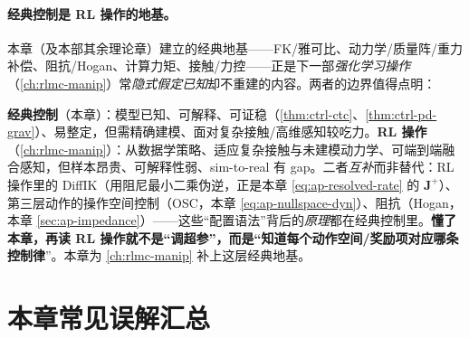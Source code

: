 \paragraph{经典控制是 RL 操作的地基。}
本章（及本部其余理论章）建立的经典地基——FK/雅可比、动力学/质量阵/重力补偿、阻抗/Hogan、计算力矩、接触/力控——正是下一部\emph{强化学习操作}（\cref{ch:rlmc-manip}）常\emph{隐式假定已知}却不重建的内容。两者的边界值得点明：

\begin{insight}\label{ins:ap-rl-boundary}
\textbf{经典控制}（本章）：模型已知、可解释、可证稳（\cref{thm:ctrl-ctc}、\cref{thm:ctrl-pd-grav}）、易整定，但需精确建模、面对复杂接触/高维感知较吃力。\textbf{RL 操作}（\cref{ch:rlmc-manip}）：从数据学策略、适应复杂接触与未建模动力学、可端到端融合感知，但样本昂贵、可解释性弱、sim-to-real 有 gap。二者\emph{互补}而非替代：RL 操作里的 DiffIK（用阻尼最小二乘伪逆，正是本章 \cref{eq:ap-resolved-rate} 的 $\mathbf{J}^{+}$）、第三层动作的操作空间控制（OSC，本章 \cref{eq:ap-nullspace-dyn}）、阻抗（Hogan，本章 \cref{sec:ap-impedance}）——这些“配置语法”背后的\emph{原理}都在经典控制里。\textbf{懂了本章，再读 RL 操作就不是“调超参”，而是“知道每个动作空间/奖励项对应哪条控制律}”。本章为 \cref{ch:rlmc-manip} 补上这层经典地基。
\end{insight}

\section*{本章常见误解汇总}

